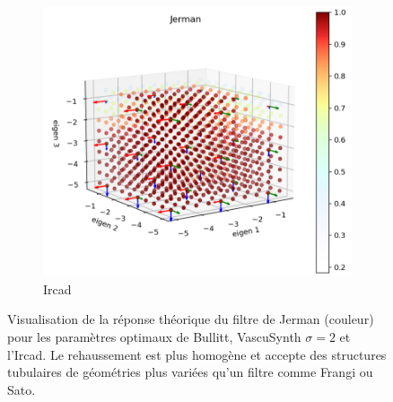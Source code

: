 \begin{figure}[!ht]
  \begin{subfigure}[t]{0.45\textwidth}
    \centering
    \includegraphics[width=\textwidth]{Images/Ircad_Jerman_BP.png}
    \caption{Ircad }
  \end{subfigure}
  \caption{Visualisation de la réponse théorique du filtre de Jerman (couleur) pour les paramètres optimaux de Bullitt, VascuSynth $\sigma=2$ et l'Ircad. Le rehaussement est plus homogène et accepte des structures tubulaires de géométries plus variées qu'un filtre comme Frangi ou Sato.}
  \label{fig:exemple_geometry_jerman}
\end{figure}
